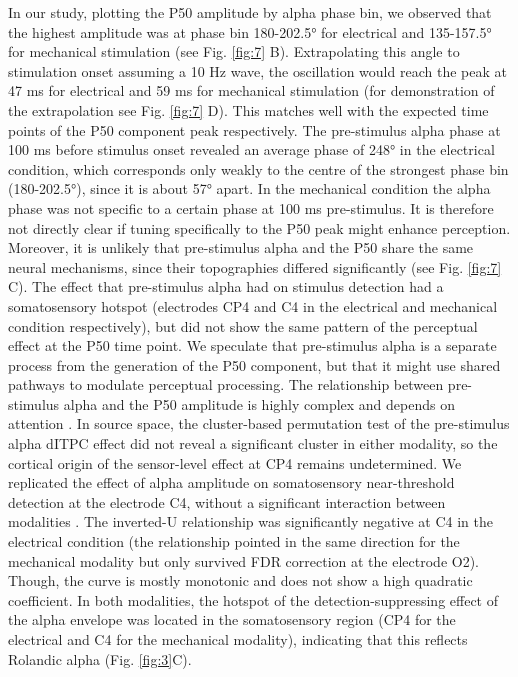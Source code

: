 \documentclass[11pt,a4paper,onecolumn]{article}
\begin{document}
In our study, plotting the P50 amplitude by alpha phase bin, we observed that the highest amplitude was at phase bin 180-202.5° for electrical and 135-157.5° for mechanical stimulation (see Fig. \ref{fig:7} B). Extrapolating this angle to stimulation onset assuming a 10 Hz wave, the oscillation would reach the peak at 47 ms for electrical and 59 ms for mechanical stimulation (for demonstration of the extrapolation see Fig. \ref{fig:7} D). This matches well with the expected time points of the P50 component peak respectively. 
The pre-stimulus alpha phase at 100 ms before stimulus onset revealed an average phase of 248° in the electrical condition, which corresponds only weakly to the centre of the strongest phase bin (180-202.5°), since it is about 57° apart. In the mechanical condition the alpha phase was not specific to a certain phase at 100 ms pre-stimulus. It is therefore not directly clear if tuning specifically to the P50 peak might enhance perception.
Moreover, it is unlikely that pre-stimulus alpha and the P50 share the same neural mechanisms, since their topographies differed significantly (see Fig. \ref{fig:7} C). The effect that pre-stimulus alpha had on stimulus detection had a somatosensory hotspot (electrodes CP4 and C4 in the electrical and mechanical condition respectively), but did not show the same pattern of the perceptual effect at the P50 time point. We speculate that pre-stimulus alpha is a separate process from the generation of the P50 component, but that it might use shared pathways to modulate perceptual processing.
The relationship between pre-stimulus alpha and the P50 amplitude is highly complex and depends on attention \cite{forschackAlphaBandBrainOscillations2017}.
In source space, the cluster-based permutation test of the pre-stimulus alpha dITPC effect did not reveal a significant cluster in either modality, so the cortical origin of the sensor-level effect at CP4 remains undetermined.
We replicated the effect of alpha amplitude on somatosensory near-threshold detection at the electrode C4, without a significant interaction between modalities \cite{aiPhasePrestimulusAlpha2014, forschackAlphaBandBrainOscillations2017}. The inverted-U relationship was significantly negative at C4 in the electrical condition (the relationship pointed in the same direction for the mechanical modality but only survived FDR correction at the electrode O2). Though, the curve is mostly monotonic and does not show a high quadratic coefficient. 
In both modalities, the hotspot of the detection-suppressing effect of the alpha envelope was located in the somatosensory region (CP4 for the electrical and C4 for the mechanical modality), indicating that this reflects Rolandic alpha (Fig. \ref{fig:3}C). 
  
\end{document}
